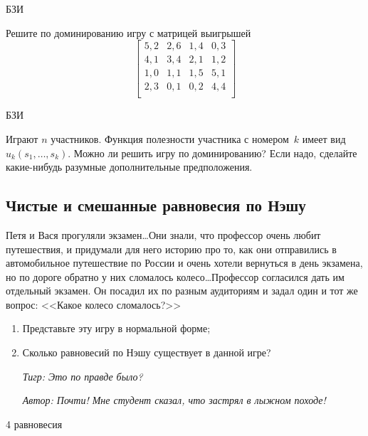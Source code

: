 \begin{problem}
\begin{source}
БЗИ
\end{source}
Решите по доминированию игру с матрицей
выигрышей
\[\left[\begin{array}{cccc} 5,2&2,6&1,4&0,3\\ 4,1&3,4&2,1&1,2\\
1,0&1,1&1,5&5,1\\ 2,3&0,1&0,2&4,4\\
\end{array}\right]\]
\begin{sol}
\end{sol}
\end{problem}




\begin{problem} 
\begin{source}
БЗИ
\end{source}
Играют $n$ участников.
Функция полезности участника с номером~$k$ имеет вид
$u_k(s_1,\ldots,s_k)$. Можно ли решить игру по
доминированию? Если надо, сделайте какие-нибудь разумные дополнительные
предположения. {}
\begin{sol}
\end{sol}
\end{problem}




\subsection{Чистые и смешанные равновесия по Нэшу}





\begin{problem}\par
Петя и Вася прогуляли экзамен\ldots Они знали, что профессор очень любит путешествия, и придумали для него историю про то, как они отправились в автомобильное путешествие по России и очень хотели вернуться в день экзамена, но по дороге обратно у них сломалось колесо\ldots Профессор согласился дать им отдельный экзамен. Он посадил их по разным аудиториям и задал один и тот же вопрос: <<Какое колесо сломалось?>>\par
\begin{enumerate}
\item 	Представьте эту игру в нормальной форме;\par
\item 	Сколько равновесий по Нэшу существует в данной игре?\par
{\it Тигр: Это по правде было?}\par
{\red \it Автор: Почти! Мне студент сказал, что застрял в лыжном походе!}\par

\end{enumerate}


\begin{sol}
4 равновесия
\end{sol}
\end{problem}



